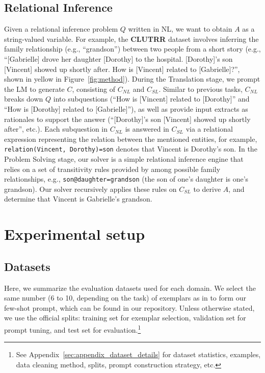 \documentclass[11pt]{article}
\begin{document}
\subsection{Relational Inference}
\label{sec:relational_inference}
Given a relational inference problem $Q$ written in NL, we want to obtain $A$ as a string-valued variable. For example, the \textbf{CLUTRR} \cite{sinha_clutrr_2019} dataset involves inferring the family relationship (e.g., ``grandson'') between two people from a short story (e.g., ``[Gabrielle] drove her daughter [Dorothy] to the hospital. [Dorothy]'s son [Vincent] showed up shortly after. How is [Vincent] related to [Gabrielle]?'', shown in yellow in Figure~\ref{fig:method}). During the Translation stage, we prompt the LM to generate $C$, consisting of $C_{NL}$ and $C_{SL}$. Similar to previous tasks, $C_{NL}$ breaks down $Q$ into subquestions (``How is [Vincent] related to [Dorothy]'' and ``How is [Dorothy] related to [Gabrielle]''), as well as provide input extracts as rationales to support the answer (``[Dorothy]'s son [Vincent] showed up shortly after'', etc.). Each subquestion in $C_{NL}$ is answered in $C_{SL}$ via a relational expression representing the relation between the mentioned entities, for example, \texttt{relation(Vincent, Dorothy)=son} denotes that Vincent is Dorothy's son. 
In the Problem Solving stage, our solver is a simple relational inference engine that relies on a set of transitivity rules provided by \citet{zhang2022improved} among possible family relationships, e.g., \texttt{son@daughter=grandson} (the son of one's daughter is one's grandson). Our solver recursively applies these rules on $C_{SL}$ to derive $A$, and determine that Vincent is Gabrielle's grandson.


\section{Experimental setup}




\subsection{Datasets}\label{sec:datasets} Here, we summarize the evaluation datasets used for each domain. We select the same number (6 to 10, depending on the task) of exemplars as in \citet{wei_chain_2022} to form our few-shot prompt, which can be found in our repository. Unless otherwise stated, we use the official splits: training set for exemplar selection, validation set for prompt tuning, and test set for evaluation.\footnote{See Appendix~\ref{sec:appendix_dataset_details} for dataset statistics, examples, data cleaning method, splits, prompt construction strategy, etc.}
\end{document}
